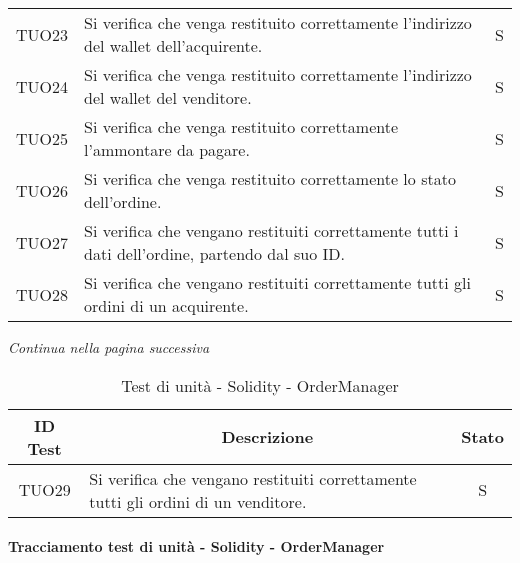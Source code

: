 \begin{table}[H]
\begin{tabular}{c|p{10cm}|c}
    TUO23 & Si verifica che venga restituito correttamente l'indirizzo del wallet\glo{} dell'acquirente.                                      & S \\
    TUO24 & Si verifica che venga restituito correttamente l'indirizzo del wallet\glo{} del venditore.                                        & S \\
    TUO25 & Si verifica che venga restituito correttamente l'ammontare da pagare.                                                             & S \\
    TUO26 & Si verifica che venga restituito correttamente lo stato dell'ordine.                                                              & S \\
    TUO27 & Si verifica che vengano restituiti correttamente tutti i dati dell'ordine, partendo dal suo ID.                                   & S \\
    TUO28 & Si verifica che vengano restituiti correttamente tutti gli ordini di un acquirente.                                               & S \\
  \end{tabular}
\end{table}
\begin{center}
  \textit{\small Continua nella pagina successiva}
\end{center}
\begin{table}[H]
  \centering
  \renewcommand{\arraystretch}{1.8}
  \begin{tabular}{c|p{10cm}|c}
    \rowcolor[HTML]{125E28}
    \color[HTML]{FFFFFF}\textbf{ID Test}
          & \multicolumn{1}{c}{\color[HTML]{FFFFFF}\textbf{Descrizione}}
          & \color[HTML]{FFFFFF}\textbf{Stato}                                                     \\
    \hline
    TUO29 & Si verifica che vengano restituiti correttamente tutti gli ordini di un venditore. & S \\
  \end{tabular}
  \caption{Test di unità - Solidity - OrderManager}
\end{table}

\paragraph{Tracciamento test di unità - Solidity - OrderManager}\label{paragraph:tracciamento_TUO}


